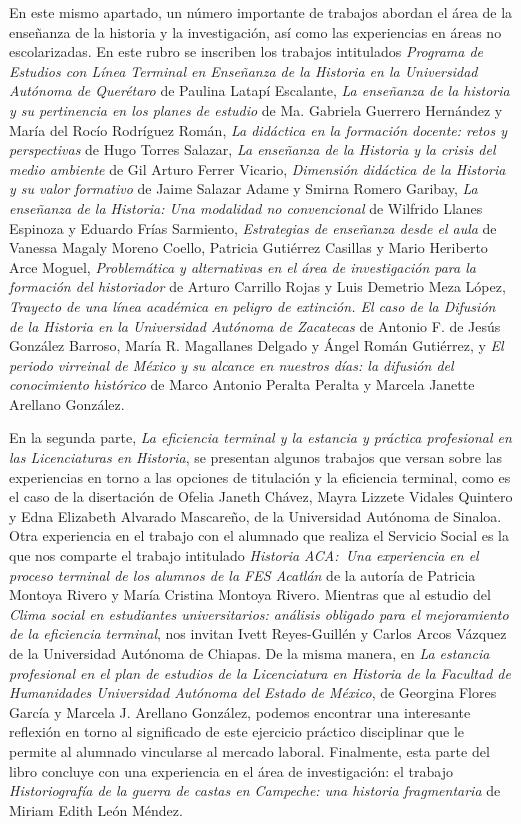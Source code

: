 \enlargethispage{1\baselineskip}
En este mismo apartado, un número importante de trabajos
abordan el área de la enseñanza de la historia y la investigación,
así como las experiencias en áreas no escolarizadas. En este rubro se
inscriben los trabajos intitulados \textit{Programa de
Estudios con Línea Terminal en Enseñanza de la Historia en la
Universidad Autónoma de Querétaro} de
Paulina Latapí Escalante, \textit{La
enseñanza de la historia y su pertinencia en los planes de
estudio} de Ma. Gabriela Guerrero Hernández y
María del Rocío Rodríguez Román,
\textit{La didáctica en la
formación docente: retos y perspectivas} de
Hugo Torres Salazar, \textit{La
enseñanza de la Historia y la crisis del medio
ambiente} de Gil Arturo Ferrer Vicario,
\textit{Dimensión didáctica de la Historia y su valor
formativo} de Jaime Salazar Adame y
Smirna Romero Garibay, \textit{La
enseñanza de la Historia: Una modalidad no
convencional} de Wilfrido Llanes
Espinoza y Eduardo Frías Sarmiento, \textit{Estrategias
de enseñanza desde el aula} de Vanessa Magaly Moreno
Coello, Patricia Gutiérrez Casillas y Mario Heriberto Arce
Moguel, \textit{Problemática y
alternativas en el área de investigación para la formación del
historiador} de Arturo Carrillo Rojas y Luis Demetrio Meza López,
\textit{Trayecto de una línea académica en peligro de extinción.
El caso de la Difusión de la Historia en la
Universidad Autónoma de Zacatecas} de
Antonio F. de Jesús González Barroso, María R.
Magallanes Delgado y Ángel Román
Gutiérrez, y \textit{El periodo virreinal de México y su alcance en
nuestros días: la difusión del conocimiento histórico}
de Marco Antonio Peralta Peralta y Marcela Janette Arellano González.

En la segunda parte, \textit{La
eficiencia terminal y la estancia y práctica profesional en las
Licenciaturas en Historia}, se presentan algunos trabajos que versan sobre
las experiencias en torno a las opciones de titulación y la
eficiencia terminal, como es el caso de la disertación de Ofelia Janeth
Chávez, Mayra Lizzete Vidales Quintero y Edna Elizabeth Alvarado Mascareño,
de la Universidad Autónoma de Sinaloa. Otra experiencia en el trabajo con
el alumnado que realiza el Servicio Social es la que nos comparte el trabajo intitulado \textit{Historia ACA:\ Una experiencia en el proceso terminal de los alumnos de la FES Acatlán} de la autoría de Patricia Montoya Rivero y
María Cristina Montoya Rivero. Mientras que al
estudio del \textit{Clima social en estudiantes universitarios:
análisis obligado para el mejoramiento de la eficiencia terminal}, nos invitan
Ivett Reyes-Guillén y Carlos Arcos Vázquez de
la Universidad Autónoma de Chiapas. De la misma manera, en \textit{La
estancia profesional en el plan de estudios de la
Licenciatura en Historia de la Facultad de Humanidades Universidad Autónoma
del Estado de México}, de Georgina Flores
García y Marcela J. Arellano González, podemos encontrar una interesante reflexión
en torno al significado de este ejercicio práctico
disciplinar que le permite al alumnado vincularse al mercado laboral.
Finalmente, esta parte del libro concluye con una experiencia en el área de investigación:  el trabajo \textit{Historiografía de la guerra de castas en Campeche: una historia fragmentaria} de  Miriam  Edith León Méndez.

